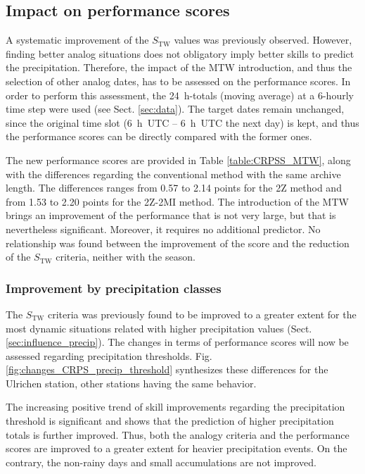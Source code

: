\documentclass[hess, manuscript]{copernicus}
\begin{document}
\subsection{Impact on performance scores}
\label{sec:influence_scores}

A systematic improvement of the $S_{\text{TW}}$ values was previously observed. However, finding better analog situations does not obligatory imply better skills to predict the precipitation. Therefore, the impact of the MTW introduction, and thus the selection of other analog dates, has to be assessed on the performance scores. In order to perform this assessment, the 24~h-totals (moving average) at a 6-hourly time step were used (see Sect. \ref{sec:data}). The target dates remain unchanged, since the original time slot (6~h~UTC -- 6~h~UTC the next day) is kept, and thus the performance scores can be directly compared with the former ones.

The new performance scores are provided in Table \ref{table:CRPSS_MTW}, along with the differences regarding the conventional method with the same archive length. The differences ranges from 0.57 to 2.14 points for the 2Z method and from 1.53 to 2.20 points for the 2Z-2MI method. The introduction of the MTW brings an improvement of the performance that is not very large, but that is nevertheless significant. Moreover, it requires no additional predictor. No relationship was found between the improvement of the score and the reduction of the $S_{\text{TW}}$ criteria, neither with the season.


\subsubsection{Improvement by precipitation classes}
\label{sec:improvement_CRPSS_precip_threshold}

The $S_{\text{TW}}$ criteria was previously found to be improved to a greater extent for the most dynamic situations related with higher precipitation values (Sect. \ref{sec:influence_precip}). The changes in terms of performance scores will now be assessed regarding precipitation thresholds. Fig. \ref{fig:changes_CRPS_precip_threshold} synthesizes these differences for the Ulrichen station, other stations having the same behavior.

The increasing positive trend of skill improvements regarding the precipitation threshold is significant and shows that the prediction of higher precipitation totals is further improved. Thus, both the analogy criteria and the performance scores are improved to a greater extent for heavier precipitation events. On the contrary, the non-rainy days and small accumulations are not improved.
\end{document}
